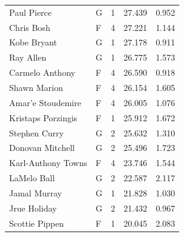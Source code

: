 \begin{table}[t]
\begin{tabular*}{\linewidth}{@{\extracolsep{\fill}}llcrr}
Paul Pierce & G & 1 & 27.439 & 0.952 \\ 
Chris Bosh & F & 4 & 27.221 & 1.144 \\ 
Kobe Bryant & G & 1 & 27.178 & 0.911 \\ 
Ray Allen & G & 1 & 26.775 & 1.573 \\ 
Carmelo Anthony & F & 4 & 26.590 & 0.918 \\ 
Shawn Marion & F & 4 & 26.154 & 1.605 \\ 
Amar'e Stoudemire & F & 4 & 26.005 & 1.076 \\ 
Kristaps Porzingis & F & 1 & 25.912 & 1.672 \\ 
Stephen Curry & G & 2 & 25.632 & 1.310 \\ 
Donovan Mitchell & G & 2 & 25.496 & 1.723 \\ 
Karl-Anthony Towns & F & 4 & 23.746 & 1.544 \\ 
LaMelo Ball & G & 2 & 22.587 & 2.117 \\ 
Jamal Murray & G & 1 & 21.828 & 1.030 \\ 
Jrue Holiday & G & 2 & 21.432 & 0.967 \\ 
Scottie Pippen & F & 1 & 20.045 & 2.083 \\ 
\bottomrule
\end{tabular*}
\end{table}

